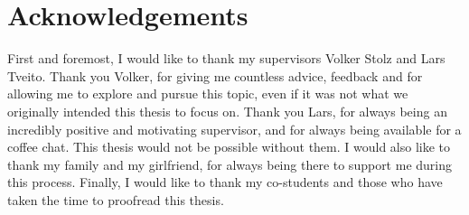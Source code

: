 \chapter*{Acknowledgements}

First and foremost, I would like to thank my supervisors Volker Stolz and Lars Tveito.
Thank you Volker, for giving me countless advice, feedback and for allowing me to explore
and pursue this topic, even if it was not what we originally intended this thesis to focus
on. Thank you Lars, for always being an incredibly positive and motivating supervisor, and
for always being available for a coffee chat. This thesis would not be possible without
them. I would also like to thank my family and my girlfriend, for always being there to
support me during this process. Finally, I would like to thank my co-students and those
who have taken the time to proofread this thesis.
